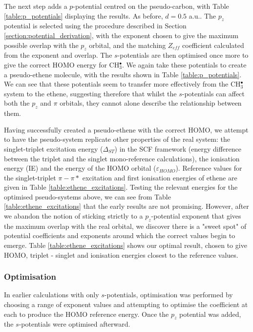 \documentclass[aip,reprint]{revtex4-1}
\begin{document}
The next step adds a \(p\)-potential centred on the pseudo-carbon, with Table \ref{table:p_potentials} displaying the results. As before, \(d = 0.5\) a.u.. The \(p_{z}\) potential is selected using the procedure described in Section \ref{section:potential_derivation}, with the exponent chosen to give the maximum possible overlap with the \(p_{z}\) orbital, and the matching \(Z_{eff}\) coefficient calculated from the exponent and overlap. The \(s\)-potentials are then optimised once more to give the correct HOMO energy for CH\(^{\bullet}_{3}\). We again take these potentials to create a pseudo-ethene molecule, with the results shown in Table \ref{table:p_potentials}. We can see that these potentials seem to transfer more effectively from the CH\(^{\bullet}_{3}\) system to the ethene, suggesting therefore that whilst the \(s\)-potentials can affect both the \(p_{z}\) and \(\pi\) orbitals, they 
cannot alone describe the relationship between them.

Having successfully created a pseudo-ethene with the correct HOMO, we attempt to have the pseudo-system replicate other properties of the real system:
the singlet-triplet excitation energy ($\Delta_{ST}$) in the SCF framework (energy difference between the triplet and the singlet mono-reference
calculations), the ionisation energy (IE) and the energy of the HOMO orbital ($\varepsilon_{HOMO}$). Reference values for the singlet-triplet \(\pi-\pi*\) excitation and first ionisation energies of ethene are given in Table \ref{table:ethene_excitations}. Testing the relevant energies for the optimised pseudo-systems above, we can see from Table \ref{table:ethene_excitations} that the early results are not promising. However, after we abandon the notion of sticking strictly to a \(p_{z}\)-potential exponent that gives the maximum overlap with the real orbital, we discover there is a "sweet spot" of potential coefficients and exponents around which the correct values begin to emerge. Table \ref{table:ethene_excitations} shows our optimal result, chosen to give HOMO, triplet - singlet and ionisation energies closest to the reference values. 

\subsubsection{Optimisation}

In earlier calculations with only \(s\)-potentials, optimisation was performed by choosing a range of exponent values and attempting to optimise the coefficient at each to produce the HOMO reference energy. Once the \(p_{z}\) potential was added, the \(s\)-potentials were optimised afterward. 
\end{document}

